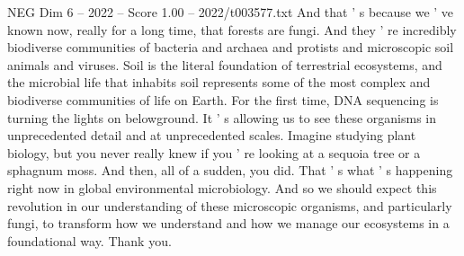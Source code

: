 \begin{textsample}{NEG Dim 6 – 2022 – Score 1.00 – 2022/t003577.txt}
And that ' s because we ' ve known now, really for a long time, that forests are fungi.
And they ' re incredibly biodiverse communities of bacteria and archaea and protists and microscopic soil animals and viruses.
Soil is the literal foundation of terrestrial ecosystems, and the microbial life that inhabits soil represents some of the most complex and biodiverse communities of life on Earth.
For the first time, DNA sequencing is turning the lights on belowground.
It ' s allowing us to see these organisms in unprecedented detail and at unprecedented scales.
Imagine studying plant biology, but you never really knew if you ' re looking at a sequoia tree or a sphagnum moss.
And then, all of a sudden, you did.
That ' s what ' s happening right now in global environmental microbiology.
And so we should expect this revolution in our understanding of these microscopic organisms, and particularly fungi, to transform how we understand and how we manage our ecosystems in a foundational way.
Thank you.

\end{textsample}
